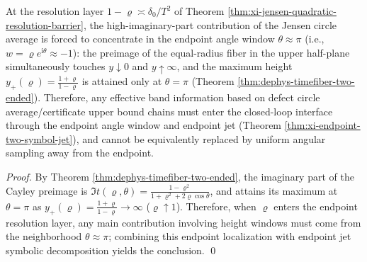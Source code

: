 \begin{corollary}\label{cor:xi-jensen-endpoint-angle-window-rigidity}
At the resolution layer \(1-\varrho\asymp \delta_0/T^2\) of Theorem \ref{thm:xi-jensen-quadratic-resolution-barrier},
the high-imaginary-part contribution of the Jensen circle average is forced to concentrate in the endpoint angle window \(\theta\approx \pi\) (i.e., \(w=\varrho e^{\mathrm{i}\theta}\approx -1\)):
the preimage of the equal-radius fiber in the upper half-plane simultaneously touches \(y\downarrow 0\) and \(y\uparrow \infty\), and the maximum height \(y_+(\varrho)=\frac{1+\varrho}{1-\varrho}\) is attained only at \(\theta=\pi\) (Theorem \ref{thm:dephys-timefiber-two-ended}).
Therefore, any effective band information based on defect circle average/certificate upper bound chains must enter the closed-loop interface through the endpoint angle window and endpoint jet (Theorem \ref{thm:xi-endpoint-two-symbol-jet}), and cannot be equivalently replaced by uniform angular sampling away from the endpoint.
\end{corollary}

\begin{proof}
By Theorem \ref{thm:dephys-timefiber-two-ended}, the imaginary part of the Cayley preimage is
\(
\Im t(\varrho,\theta)=\frac{1-\varrho^2}{1+\varrho^2+2\varrho\cos\theta}
\),
and attains its maximum at \(\theta=\pi\) as \(y_+(\varrho)=\frac{1+\varrho}{1-\varrho}\to\infty\) (\(\varrho\uparrow 1\)).
Therefore, when \(\varrho\) enters the endpoint resolution layer, any main contribution involving height windows must come from the neighborhood \(\theta\approx\pi\); combining this endpoint localization with endpoint jet symbolic decomposition yields the conclusion. \qed
\end{proof}


